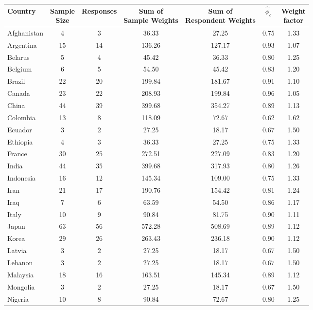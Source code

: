 \documentclass{article}
\theoremstyle{definition}
\begin{document}
\begin{table}[H]
\centering
\begin{tabular}{l|cccccc}
Country & \shortstack{Sample \\ Size} & Responses & \shortstack{Sum of \\ Sample Weights} & \shortstack{Sum of \\ Respondent Weights} & $\hat{\phi}_c$ & \shortstack{Weight \\ factor} \\
  \hline
Afghanistan &   4 &   3 & 36.33 & 27.25 & 0.75 & 1.33 \\
Argentina &  15 &  14 & 136.26 & 127.17 & 0.93 & 1.07 \\
Belarus &   5 &   4 & 45.42 & 36.33 & 0.80 & 1.25 \\
Belgium &   6 &   5 & 54.50 & 45.42 & 0.83 & 1.20 \\
Brazil &  22 &  20 & 199.84 & 181.67 & 0.91 & 1.10 \\
Canada &  23 &  22 & 208.93 & 199.84 & 0.96 & 1.05 \\
China &  44 &  39 & 399.68 & 354.27 & 0.89 & 1.13 \\
Colombia &  13 &   8 & 118.09 & 72.67 & 0.62 & 1.62 \\
Ecuador &   3 &   2 & 27.25 & 18.17 & 0.67 & 1.50 \\
Ethiopia &   4 &   3 & 36.33 & 27.25 & 0.75 & 1.33 \\
France &  30 &  25 & 272.51 & 227.09 & 0.83 & 1.20 \\
India &  44 &  35 & 399.68 & 317.93 & 0.80 & 1.26 \\
Indonesia &  16 &  12 & 145.34 & 109.00 & 0.75 & 1.33 \\
Iran &  21 &  17 & 190.76 & 154.42 & 0.81 & 1.24 \\
Iraq &   7 &   6 & 63.59 & 54.50 & 0.86 & 1.17 \\
Italy &  10 &   9 & 90.84 & 81.75 & 0.90 & 1.11 \\
Japan &  63 &  56 & 572.28 & 508.69 & 0.89 & 1.12 \\
Korea  &  29 &  26 & 263.43 & 236.18 & 0.90 & 1.12 \\
Latvia &   3 &   2 & 27.25 & 18.17 & 0.67 & 1.50 \\
Lebanon &   3 &   2 & 27.25 & 18.17 & 0.67 & 1.50 \\
Malaysia &  18 &  16 & 163.51 & 145.34 & 0.89 & 1.12 \\
Mongolia &   3 &   2 & 27.25 & 18.17 & 0.67 & 1.50 \\
Nigeria &  10 &   8 & 90.84 & 72.67 & 0.80 & 1.25 \\

\end{tabular}
\end{table}
\end{document}
